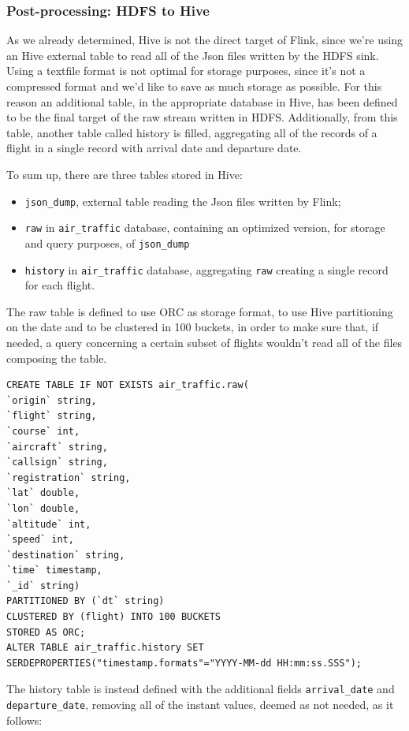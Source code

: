 \subsubsection{Post-processing: HDFS to Hive}

As we already determined, Hive is not the direct target of Flink, since we're using an Hive external table to read all of the Json files written by the HDFS sink. Using a textfile format is not optimal for storage purposes, since it's not a compressed format and we'd like to save as much storage as possible. For this reason an additional table, in the appropriate database in Hive, has been defined to be the final target of the raw stream written in HDFS. Additionally, from this table, another table called history is filled, aggregating all of the records of a flight in a single record with arrival date and departure date.

To sum up, there are three tables stored in Hive:
\begin{itemize}
    \item \texttt{json\_dump}, external table reading the Json files written by Flink;
    \item \texttt{raw} in \texttt{air\_traffic} database, containing an optimized version, for storage and query purposes, of \texttt{json\_dump} 
    \item \texttt{history} in \texttt{air\_traffic} database, aggregating \texttt{raw} creating a single record for each flight.
\end{itemize}

The raw table is defined to use ORC as storage format, to use Hive partitioning on the date and to be clustered in 100 buckets, in order to make sure that, if needed, a query concerning a certain subset of flights wouldn't read all of the files composing the table.

\begin{verbatim}
CREATE TABLE IF NOT EXISTS air_traffic.raw(
`origin` string,
`flight` string,
`course` int,
`aircraft` string,
`callsign` string,
`registration` string,
`lat` double,
`lon` double,
`altitude` int,
`speed` int,
`destination` string,
`time` timestamp,
`_id` string)
PARTITIONED BY (`dt` string)
CLUSTERED BY (flight) INTO 100 BUCKETS
STORED AS ORC;
ALTER TABLE air_traffic.history SET SERDEPROPERTIES("timestamp.formats"="YYYY-MM-dd HH:mm:ss.SSS");
\end{verbatim}

The history table is instead defined with the additional fields \texttt{arrival\_date} and \texttt{departure\_date}, removing all of the instant values, deemed as not needed, as it follows:

